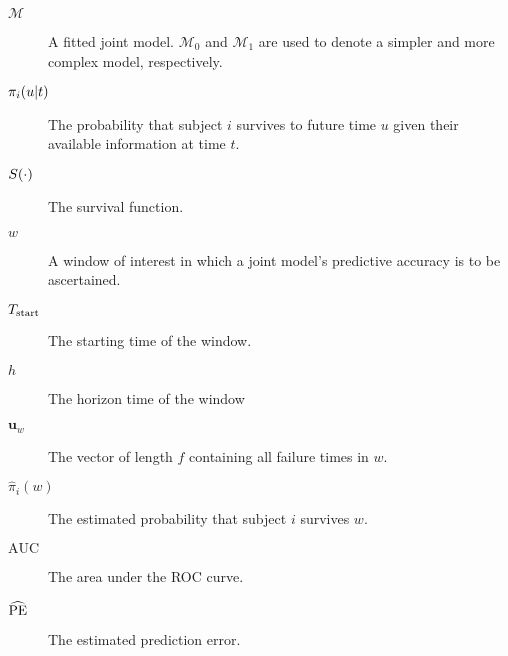 \begin{small}
\begin{multicols}{2}
\begin{description}
    \item[$\mathcal{M}$] A fitted joint model. $\mathcal{M}_0$ and $\mathcal{M}_1$ are used to denote a simpler and more complex model, respectively. 
    \item[$\pi_i\!\left( u|t\right)$] The probability that subject $i$ survives to future time $u$ given their available information at time $t$.
    \item[$S\!\left(\cdot\right)$] The survival function. 
    \item[$w$] A window of interest in which a joint model's predictive accuracy is to be ascertained. 
    \item[$T_{\mathrm{start}}$] The starting time of the window.
    \item[$h$] The horizon time of the window
    \item[$\bm{u}_w$] The vector of length $f$ containing all failure times in $w$.
    \item[$\hat{\pi}_i(w)$] The estimated probability that subject $i$ survives $w$. 
    \item[$\mathrm{AUC}$] The area under the ROC curve.
    \item[$\widehat{\mathrm{PE}}$] The estimated prediction error.
\end{description}

\end{multicols}
\end{small}